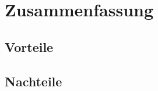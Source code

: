 \chapter{Zusammenfassung}
\label{zusammenfassung}

\section{Vorteile}
\label{vorteile}

\section{Nachteile}
\label{nachteile}
